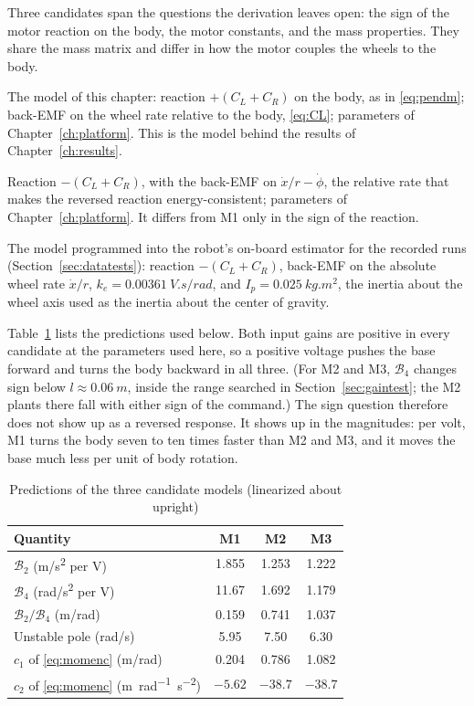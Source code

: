 Three candidates span the questions the derivation leaves open: the sign
of the motor reaction on the body, the motor constants, and the mass
properties. They share the mass matrix and differ in how the motor couples the
wheels to the body.
\begin{description}[style=unboxed,leftmargin=0pt]
\item[M1.] The model of this chapter: reaction $+(C_L+C_R)$ on the body, as in
\eqref{eq:pendm}; back-EMF on the wheel rate relative to the body,
\eqref{eq:CL}; parameters of Chapter~\ref{ch:platform}. This is the model
behind the results of Chapter~\ref{ch:results}.
\item[M2 (reversed sign).] Reaction $-(C_L+C_R)$, with the back-EMF on
$\dot x/r-\dot\phi$, the relative rate that makes the reversed reaction
energy-consistent; parameters of Chapter~\ref{ch:platform}. It differs from M1
only in the sign of the reaction.
\item[M3 (firmware model).] The model programmed into the robot's on-board
estimator for the recorded runs (Section~\ref{sec:datatests}): reaction
$-(C_L+C_R)$, back-EMF on the absolute wheel rate $\dot x/r$,
$k_e=\SI{0.00361}{V.s/rad}$, and $I_p=\SI{0.025}{kg.m^2}$, the inertia about
the wheel axis used as the inertia about the center of gravity.
\end{description}
Table~\ref{tab:candidates} lists the predictions used below. Both input gains
are positive in every candidate at the parameters used here, so a positive
voltage pushes the base forward and turns the body backward in all three. (For
M2 and M3, $\mathcal{B}_4$ changes sign below $l\approx\SI{0.06}{m}$, inside the
range searched in Section~\ref{sec:gaintest}; the M2 plants there fall with
either sign of the command.) The sign question therefore does not
show up as a reversed response. It shows up in the magnitudes: per volt, M1
turns the body seven to ten times faster than M2 and M3, and it moves the
base much less per unit of body rotation.

\begin{table}[htbp]
\centering
\caption{Predictions of the three candidate models (linearized about upright)}
\label{tab:candidates}
\begin{tabular}{lccc}
\toprule
Quantity & M1 & M2 & M3 \\
\midrule
$\mathcal{B}_2$ (\si{m/s^2} per \si{V}) & 1.855 & 1.253 & 1.222 \\
$\mathcal{B}_4$ (\si{rad/s^2} per \si{V}) & 11.67 & 1.692 & 1.179 \\
$\mathcal{B}_2/\mathcal{B}_4$ (\si{m/rad}) & 0.159 & 0.741 & 1.037 \\
Unstable pole (\si{rad/s}) & 5.95 & 7.50 & 6.30 \\
$c_1$ of \eqref{eq:momenc} (\si{m/rad}) & 0.204 & 0.786 & 1.082 \\
$c_2$ of \eqref{eq:momenc} (\si{m.rad^{-1}.s^{-2}}) & $-5.62$ & $-38.7$ & $-38.7$ \\
\bottomrule
\end{tabular}
\end{table}

